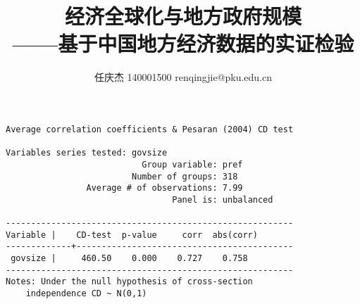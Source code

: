 \documentclass[10pt]{article}
\author{任庆杰  140001500  renqingjie@pku.edu.cn}
\title{经济全球化与地方政府规模\\
    ——基于中国地方经济数据的实证检验}
\begin{document}
\maketitle{}
\begin{framed}
    \begin{verbatim}
Average correlation coefficients & Pesaran (2004) CD test

Variables series tested: govsize
                           Group variable: pref
                         Number of groups: 318
                Average # of observations: 7.99
                                 Panel is: unbalanced

---------------------------------------------------------
Variable |    CD-test  p-value     corr  abs(corr)
-------------+-------------------------------------------
 govsize |     460.50    0.000    0.727    0.758
---------------------------------------------------------
Notes: Under the null hypothesis of cross-section 
    independence CD ~ N(0,1)
\end{verbatim}
\end{framed}
\end{document}
